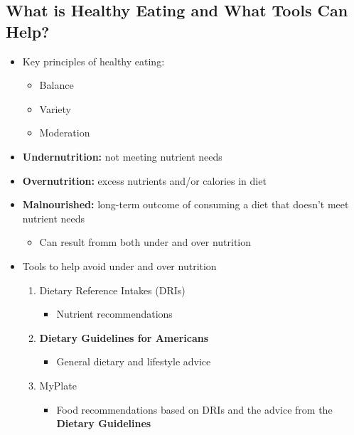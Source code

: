 \documentclass[12pt]{article}
\begin{document}
        \subsection{What is Healthy Eating and What Tools Can Help?}
            \begin{itemize}
                \item Key principles of healthy eating:
                    \begin{itemize}
                        \item Balance
                        \item Variety
                        \item Moderation
                    \end{itemize}
                \item \textbf{Undernutrition:} not meeting nutrient needs
                \item \textbf{Overnutrition:} excess nutrients and/or calories in diet
                \item \textbf{Malnourished:} long-term outcome of consuming a diet that doesn't meet nutrient needs
                    \begin{itemize}
                        \item Can result fromm both under and over nutrition
                    \end{itemize}
                \item Tools to help avoid under and over nutrition
                    \begin{enumerate}
                        \item Dietary Reference Intakes (DRIs)
                            \begin{itemize}
                                \item Nutrient recommendations
                            \end{itemize}
                        \item \textbf{Dietary Guidelines for Americans}
                            \begin{itemize}
                                \item General dietary and lifestyle advice
                            \end{itemize}
                        \item MyPlate
                            \begin{itemize}
                                \item Food recommendations based on DRIs and the advice from the \textbf{Dietary Guidelines}

\end{itemize}
\end{enumerate}
\end{itemize}
\end{document}
